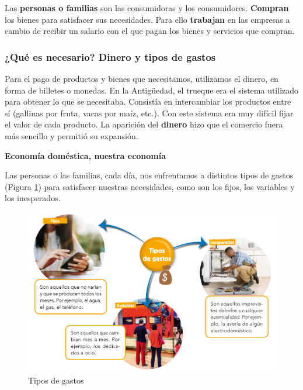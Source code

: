 \vspace{3mm}
Las \textbf{personas o familias} son las consumidoras y los consumidores. \textbf{Compran} los bienes para satisfacer sus necesidades. Para ello \textbf{trabajan} en las empresas a cambio de recibir un salario con el que pagan los bienes y servicios que compran.

\subsubsection{¿Qué es necesario? Dinero y tipos de gastos}

Para el pago de productos y bienes que necesitamos, utilizamos el dinero, en forma de billetes o monedas.
En la Antigüedad, el trueque era el sistema utilizado para obtener lo que se necesitaba. Consistía en intercambiar los productos entre sí (gallinas por fruta, vacas por maíz, etc.). Con este sistema era muy difícil fijar el valor de cada producto. La aparición del \textbf{dinero} hizo que el comercio fuera más sencillo y permitió su expansión.

\vspace{3mm}
\textbf{Economía doméstica, nuestra economía}

\vspace{3mm}
Las personas o las familias, cada día, nos enfrentamos a distintos tipos de gastos (Figura \ref{fig:tipos-gastos}) para satisfacer nuestras necesidades, como son los fijos, los variables y los inesperados.

\begin{figure}[!ht]
    \centering
    \includegraphics[width=1\linewidth]{Tema4/01_Tipos_gastos.png}
    \caption{Tipos de gastos}
    \label{fig:tipos-gastos}
\end{figure}

